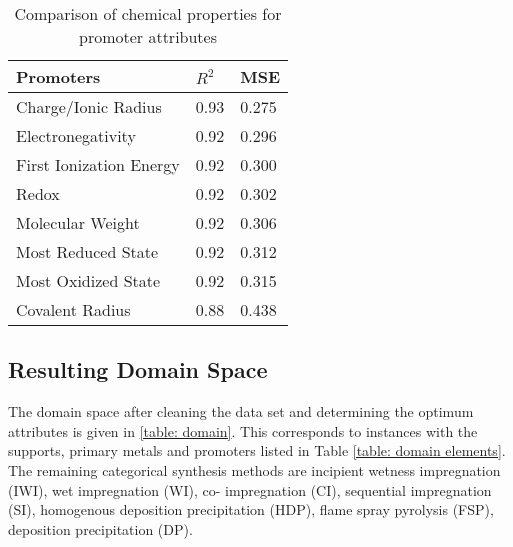	\begin{table}[ht]
		\centering
		\caption{Comparison of chemical properties for promoter attributes}
		\label{table: promoter Att}
		\begin{tabular}{lll}
		\textbf{Promoters}      & \textbf{$R^2$} & \textbf{MSE} \\ \hline
		Charge/Ionic Radius     & 0.93                         & 0.275        \\
		Electronegativity       & 0.92                         & 0.296        \\
		First Ionization Energy & 0.92                         & 0.300        \\
		Redox                   & 0.92                         & 0.302        \\
		Molecular Weight        & 0.92                         & 0.306        \\
		Most Reduced State      & 0.92                         & 0.312        \\
		Most Oxidized State     & 0.92                         & 0.315        \\
		Covalent Radius         & 0.88                         & 0.438       
		\end{tabular}
		\end{table}

	\subsection{Resulting Domain Space}
	The domain space after cleaning the data set and determining the optimum attributes is given in \ref{table: domain}. This corresponds to instances with the supports, primary metals and promoters listed in Table \ref{table: domain elements}. The remaining categorical synthesis methods are incipient wetness impregnation (IWI), wet impregnation (WI), co- impregnation (CI), sequential impregnation (SI), homogenous deposition precipitation (HDP), flame spray pyrolysis (FSP), deposition precipitation (DP). 

